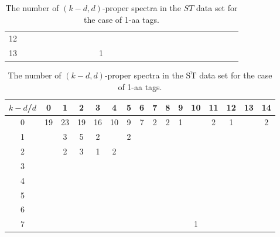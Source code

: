 \documentclass{article}
\def\STbar{{\overline{\mathrm{ST}}}}
\begin{document}
\begin{landscape}
\begin{table}[h]
{\begin{tabular}{|c|c|
c|c|c|c|c|c|c|c|c|c|c|c|c|c|c|c|c|c|c|c|c|c|c|c|c|}
12  &  &  &  &  &  &  &  &  &  &  &  &  &  &  &  &  &  &  &  &  &  &  &  &  &  & \\

13  &  &  &  &  &  &  &  &  &  & 1 &  &  &  &  &  &  &  &  &  &  &  &  &  &  &  & \\

  \hline
\end{tabular}
\par}
\centering
\caption{The number of $(k-d,d)$-proper spectra in the $ST$ data set for the case of 1-aa tags.}
\vspace{3mm}
\label{table:kd-1-ST}
\end{table}
\end{landscape}
\begin{landscape}

\begin{table}[h]\footnotesize
{\centering
\begin{tabular}{|c|c|
c|c|c|c|c|c|c|c|c|c|c|c|c|c|}
  \hline
  $k-d$/$d$ 
 & 0 & 1 & 2 & 3 & 4 & 5 & 6 & 7 & 8 & 9 & 10 & 11 & 12 & 13 & 14\\

  \hline
  \hline

0  & 19 & 23 & 19 & 16 & 10 & 9 & 7 & 2 & 2 & 1 &  & 2 & 1 &  & 2\\

1  &  & 3 & 5 & 2 &  & 2 &  &  &  &  &  &  &  &  & \\

2  &  & 2 & 3 & 1 & 2 &  &  &  &  &  &  &  &  &  & \\

3  &  &  &  &  &  &  &  &  &  &  &  &  &  &  & \\

4  &  &  &  &  &  &  &  &  &  &  &  &  &  &  & \\

5  &  &  &  &  &  &  &  &  &  &  &  &  &  &  & \\

6  &  &  &  &  &  &  &  &  &  &  &  &  &  &  & \\

7  &  &  &  &  &  &  &  &  &  &  & 1 &  &  &  & \\

  \hline
\end{tabular}
\par}
\centering
\caption{The number of $(k-d,d)$-proper spectra in the $\STbar$ data set for the case of 1-aa tags.}
\vspace{3mm}
\label{table:kd-1-ST}
\end{table}
\end{landscape}
\end{document}
